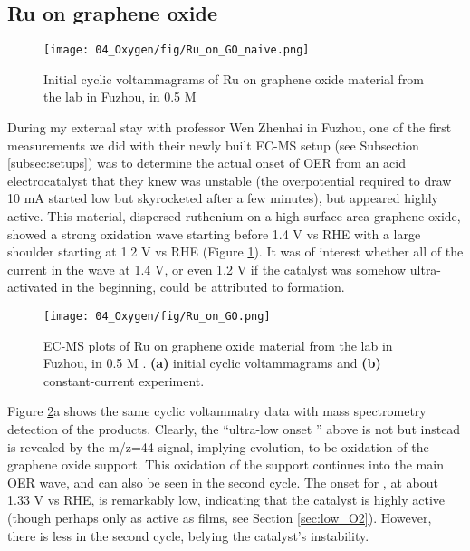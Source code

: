 \subsection{Ru on graphene oxide}

\begin{figure}[h]
	\centering
	\texttt{[image: 04\_Oxygen/fig/Ru\_on\_GO\_naive.png]}
	\caption{Initial cyclic voltammagrams of Ru on graphene oxide material from the lab in Fuzhou, in 0.5 M }
	\label{fig:Ru_on_GO_naive}
\end{figure}

During my external stay with professor Wen Zhenhai in Fuzhou, one of the first measurements we did with their newly built EC-MS setup (see Subsection \ref{subsec:setups}) was to determine the actual onset of OER from an acid electrocatalyst that they knew was unstable (the overpotential required to draw 10 mA started low but skyrocketed after a few minutes), but appeared highly active. This material, dispersed ruthenium on a high-surface-area graphene oxide, showed a strong oxidation wave starting before 1.4 V vs RHE with a large shoulder starting at 1.2 V vs RHE (Figure \ref{fig:Ru_on_GO_naive}). It was of interest whether all of the current in the wave at 1.4 V, or even 1.2 V if the catalyst was somehow ultra-activated in the beginning, could be attributed to  formation.

\begin{figure}[h]
	\centering
	\texttt{[image: 04\_Oxygen/fig/Ru\_on\_GO.png]}
	\caption{EC-MS plots of Ru on graphene oxide material from the lab in Fuzhou, in 0.5 M . \textbf{(a)} initial cyclic voltammagrams and \textbf{(b)} constant-current experiment.}
	\label{fig:Ru_on_GO}
\end{figure}

Figure \ref{fig:Ru_on_GO}a shows the same cyclic voltammatry data with mass spectrometry detection of the products. Clearly, the ``ultra-low onset '' above is not  but instead is revealed by the m/z=44 signal, implying  evolution, to be oxidation of the graphene oxide support. This oxidation of the support continues into the main OER wave, and can also be seen in the second cycle. The onset for , at about 1.33 V vs RHE, is remarkably low, indicating that the catalyst is highly active (though perhaps only as active as  films, see Section \ref{sec:low_O2}). However, there is less  in the second cycle, belying the catalyst's instability.

